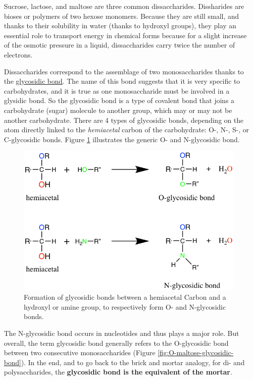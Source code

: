 \documentclass[]{book}
\theoremstyle{definition}
\theoremstyle{definition}
\theoremstyle{definition}
\theoremstyle{remark}
\begin{document}
Sucrose, lactose, and maltose are three common dissaccharides.
Dissharides are bioses or polymers of two hexose monomers. Because they
are still small, and thanks to their solubility in water (thanks to
hydroxyl groups), they play an essential role to transport energy in
chemical forms because for a slight increase of the osmotic pressure in
a liquid, dissaccharides carry twice the number of electrons.

Dissaccharides correspond to the assemblage of two monosaccharides
thanks to the \protect\hyperlink{glycosidic-bond}{glycosidic bond}. The
name of this bond suggests that it is very specific to carbohydrates,
and it is true as one monosaccharide must be involved in a glysidic
bond. So the glycosidic bond is a type of covalent bond that joins a
carbohydrate (sugar) molecule to another group, which may or may not be
another carbohydrate. There are 4 types of glycosidic bonds, depending
on the atom directly linked to the \emph{hemiacetal} carbon of the
carbohydrate: O-, N-, S-, or C-glycosidic bonds. Figure
\ref{fig:O-N-glycosidic-bond} illustrates the generic O- and
N-glycosidic bond.

\begin{figure}

{\centering \includegraphics[width=0.65\linewidth]{pictures/O-N-glycosidic-bond} 

}

\caption{Formation of glycosidic bonds between a hemiacetal Carbon and a hydroxyl or amine group, to respectively form O- and N-glycosidic bonds.}\label{fig:O-N-glycosidic-bond}
\end{figure}

The N-glycosidic bond occurs in nucleotides and thus plays a major role.
But overall, the term glycosidic bond generally refers to the
O-glycosidic bond between two consecutive monosaccharides (Figure
\ref{fig:O-maltose-glycosidic-bond}). In the end, and to go back to the
brick and mortar analogy, for di- and polysaccharides, the
\textbf{glycosidic bond is the equivalent of the mortar}.
\end{document}
